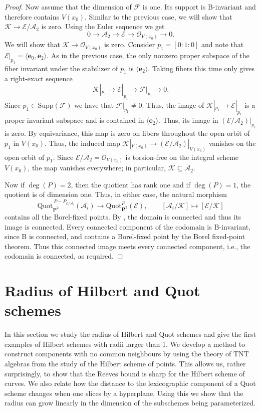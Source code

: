 \documentclass[leqno,11pt,a4paper]{amsart}
\theoremstyle{definition}
\numberwithin{equation}{section}
\newcommand{\Quot}{\mathrm{Quot}}
\newcommand{\PP}{\mathbf{P}}
\newcommand{\bfe}{\mathbf{e}}
\newcommand{\EE}{\mathscr{E}}
\newcommand{\FF}{\mathscr{F}}
\newcommand{\OO}{\mathscr{O}}
\newcommand{\KK}{\mathscr{K}}
\begin{document}
\begin{proof}
Now assume that the dimension of $\FF$ is one.
Its support is $\mathrm{B}$-invariant and therefore contains $V(x_0)$.
Similar to the previous case, we will show that $\KK \to \EE/\mathscr{A}_2$ is zero.
Using the Euler sequence we get
$$
0 \longrightarrow \mathscr{A}_2 \longrightarrow \EE \longrightarrow \OO_{V(x_0)} \longrightarrow 0.
$$
We will show that $\KK\to\OO_{V(x_0)}$ is zero.
Consider $p_1=[0:1:0]$ and note that $\EE|_{p_1} = \langle\bfe_0,\bfe_2\rangle$. 
As in the previous case, the only nonzero proper subspace of the fiber invariant under the stabilizer of $p_1$ is $\langle\bfe_2\rangle$. 
Taking fibers this time only gives a right-exact sequence
$$
\KK|_{p_1} \longrightarrow \EE|_{p_1} \longrightarrow \FF|_{p_1} \longrightarrow 0.
$$
Since $p_1 \in \text{Supp}(\FF)$ we have that $\FF|_{p_1} \ne 0$. 
Thus, the image of $\KK|_{p_1} \to \EE|_{p_1}$ is a proper invariant subspace and is contained in $\langle\bfe_2\rangle$. Thus, its image in $(\EE/\mathscr{A}_2)|_{p_1}$ is zero.
By equivariance, this map is zero on fibers throughout the open orbit of $p_1$ in $V(x_0)$. 
Thus, the induced map $\KK|_{V(x_0)} \to  (\EE/\mathscr{A}_2)|_{V(x_0)}$ vanishes on the open orbit of $p_1$.
Since $\EE/\mathscr{A}_2=\OO_{V(x_0)}$ is torsion-free on the integral scheme $V(x_0)$, the map vanishes everywhere; in particular, $\KK \subseteq \mathscr{A}_2$.

Now if $\deg(P) = 2$, then the quotient has rank one and if $\deg(P) = 1$, the quotient is of dimension one. Thus, in either case, the natural morphism
$$
\Quot_{\PP^2}^{\,P-P_{\EE/\mathscr A_i}}(\mathscr A_i) \longrightarrow \Quot^P_{\PP^2}(\EE),
\qquad [\mathscr{A}_i/\KK] \mapsto [\EE/\KK]
$$
contains all the Borel-fixed points.
By , the domain is connected and thus its image is connected.  
Every connected component of the codomain is $\mathrm{B}$-invariant, since $\mathrm{B}$ is connected, and contains a Borel-fixed point by the Borel fixed-point theorem.
Thus this connected image meets every connected component, i.e., the codomain is connected, as required.
\end{proof}





\section{Radius of Hilbert and Quot schemes}
\label{radius_sec}

In this section we study the radius of Hilbert and Quot schemes and give the first examples of Hilbert schemes with radii larger than 1.
We develop a method to construct components with no common neighbours by using the theory of TNT algebras from the study of the Hilbert scheme of points.
This allows us, rather surprisingly, to show that the Reeves bound is sharp for the Hilbert scheme of curves. 
We also relate how the distance to the lexicographic component of a Quot scheme changes when one slices by a hyperplane.
Using this we show that the radius can grow linearly in the dimension of the subschemes being parameterized.
\end{document}

